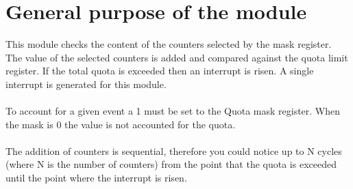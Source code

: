 \newpage
\section{General purpose of the module}

This module checks the content of the counters selected by the mask register. The value of the selected counters is added and compared against the quota limit register. If the total quota 
is exceeded then an interrupt is risen. A single interrupt is generated for this module.\\
\\
To account for a given event a 1 must be set to the Quota mask register. When the mask is 0 the value is not accounted for the quota.\\
\\
The addition of counters is sequential, therefore you could notice up to N cycles (where N is the number of counters) from the point that the quota is exceeded until the point where the interrupt is risen.\\
\\
